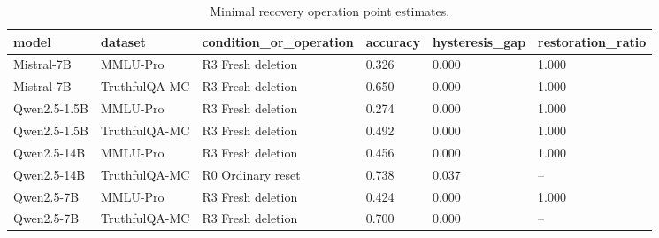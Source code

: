 \begin{table}
\caption{Minimal recovery operation point estimates.}
\label{tab:minimal-recovery-compact}
\begin{tabular}{llllll}
\toprule
model & dataset & condition\_or\_operation & accuracy & hysteresis\_gap & restoration\_ratio \\
\midrule
Mistral-7B & MMLU-Pro & R3 Fresh deletion & 0.326 & 0.000 & 1.000 \\
Mistral-7B & TruthfulQA-MC & R3 Fresh deletion & 0.650 & 0.000 & 1.000 \\
Qwen2.5-1.5B & MMLU-Pro & R3 Fresh deletion & 0.274 & 0.000 & 1.000 \\
Qwen2.5-1.5B & TruthfulQA-MC & R3 Fresh deletion & 0.492 & 0.000 & 1.000 \\
Qwen2.5-14B & MMLU-Pro & R3 Fresh deletion & 0.456 & 0.000 & 1.000 \\
Qwen2.5-14B & TruthfulQA-MC & R0 Ordinary reset & 0.738 & 0.037 & -- \\
Qwen2.5-7B & MMLU-Pro & R3 Fresh deletion & 0.424 & 0.000 & 1.000 \\
Qwen2.5-7B & TruthfulQA-MC & R3 Fresh deletion & 0.700 & 0.000 & -- \\
\bottomrule
\end{tabular}
\end{table}
